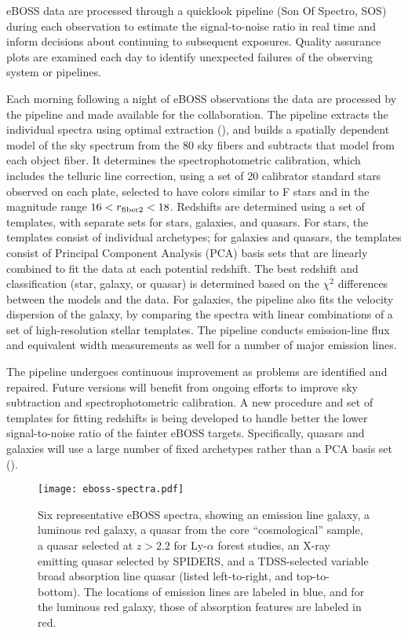 eBOSS data are processed through a quicklook pipeline (Son Of Spectro,
SOS) during each observation to estimate the signal-to-noise ratio in
real time and inform decisions about continuing to subsequent
exposures.  Quality assurance plots are examined each day to identify
unexpected failures of the observing system or pipelines.

Each morning following a night of eBOSS observations the data are
processed by the pipeline and made available for the collaboration.
The pipeline extracts the individual spectra using optimal extraction
(\citealt{horne86a}), and builds a spatially dependent model of the
sky spectrum from the 80 sky fibers and subtracts that model from each
object fiber. It determines the spectrophotometric calibration, which
includes the telluric line correction, using a set of 20 calibrator
standard stars observed on each plate, selected to have colors similar
to F stars and in the magnitude range $16<r_{\rm fiber2}<18$.
Redshifts are determined using a set of templates, with separate sets
for stars, galaxies, and quasars. For stars, the templates consist of
individual archetypes; for galaxies and quasars, the templates consist
of Principal Component Analysis (PCA) basis sets that are linearly
combined to fit the data at each potential redshift. The best redshift
and classification (star, galaxy, or quasar) is determined based on
the $\chi^2$ differences between the models and the data. For
galaxies, the pipeline also fits the velocity dispersion of the
galaxy, by comparing the spectra with linear combinations of a set of
high-resolution stellar templates. The pipeline conducts emission-line
flux and equivalent width measurements as well for a number of major
emission lines.

The pipeline undergoes continuous improvement as problems are
identified and repaired. Future versions will benefit from ongoing
efforts to improve sky subtraction and spectrophotometric
calibration. A new procedure and set of templates for fitting
redshifts is being developed to handle better the lower
signal-to-noise ratio of the fainter eBOSS targets. Specifically,
quasars and galaxies will use a large number of fixed archetypes
rather than a PCA basis set (\citealt{hutchinson16a}).

\begin{figure*}[t!]
\centering
\texttt{[image: eboss-spectra.pdf]}
\caption{ \label{fig:eboss-spectra}
Six representative eBOSS spectra, showing an emission line galaxy, a
luminous red galaxy, a quasar from the core ``cosmological'' sample, a
quasar selected at $z>2.2$ for Ly-$\alpha$ forest studies, an X-ray
emitting quasar selected by SPIDERS, and a TDSS-selected variable
broad absorption line quasar (listed left-to-right, and
top-to-bottom). The locations of emission lines are labeled in blue,
and for the luminous red galaxy, those of absorption features are
labeled in red.}
\end{figure*}

